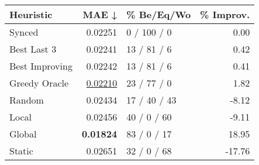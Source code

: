 \begin{tabular}{lrlr}
\toprule
\textbf{Heuristic} & \textbf{MAE ↓} & \textbf{\% Be/Eq/Wo} & \textbf{\% Improv.} \\
\midrule
            Synced &        0.02251 &          0 / 100 / 0 &                0.00 \\
\midrule
       Best Last 3 &        0.02241 &          13 / 81 / 6 &                0.42 \\
    Best Improving &        0.02242 &          13 / 81 / 6 &                0.41 \\
\addlinespace
     Greedy Oracle &        \underline{0.02210} &          23 / 77 / 0 &                1.82 \\
            Random &        0.02434 &         17 / 40 / 43 &               -8.12 \\
\midrule
             Local &        0.02456 &          40 / 0 / 60 &               -9.11 \\
            Global &        \textbf{0.01824} &          83 / 0 / 17 &               18.95 \\
\midrule
            Static &        0.02651 &          32 / 0 / 68 &              -17.76 \\
\bottomrule
\end{tabular}

\label{tab:iid_lr05_le1_bs2_Summary}
